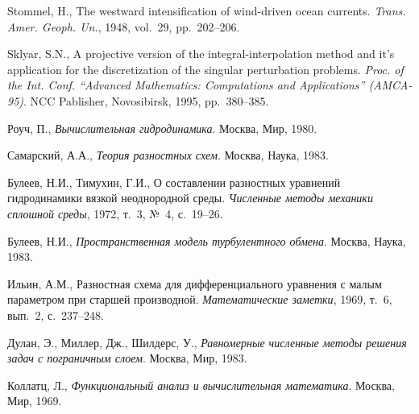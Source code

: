 \documentclass[press]{vestnik}
\begin{document}
\begin{thebibliography}{12}
Stommel, H., The westward intensification of wind-driven ocean currents. \emph{Trans. Amer. Geoph. Un.}, 1948, vol.~29, pp.~202--206.

Sklyar, S.N., A projective version of the integral-interpolation method and it's application for the discretization of the singular perturbation problems. \emph{Proc. of the Int. Conf. ``Advanced Mathematics: Computations and Applications'' (AMCA-95)}. NCC Pablisher, Novosibirsk, 1995, pp.~380--385.

Роуч, П., \emph{Вычислительная гидродинамика}. Москва, Мир, 1980. 

Самарский, А.А., \emph{Теория разностных схем}. Москва, Наука, 1983. 

Булеев, Н.И., Тимухин, Г.И., О составлении разностных уравнений гидродинамики вязкой неоднородной среды. \emph{Численные методы механики сплошной среды}, 1972, т.~3, №~4, с.~19--26. 

Булеев, Н.И., \emph{Пространственная модель турбулентного обмена}. Москва, Наука, 1983. 

Ильин, А.М., Разностная схема для дифференциального уравнения с малым параметром при старшей производной. \emph{Математические заметки}, 1969, т.~6, вып.~2, с.~237--248. 

Дулан, Э., Миллер, Дж., Шилдерс, У., \emph{Равномерные численные методы решения задач с пограничным слоем}. Москва, Мир, 1983. 

Коллатц, Л., \emph{Функциональный анализ и вычислительная математика}. Москва, Мир, 1969. 
\end{thebibliography}
\end{document}
